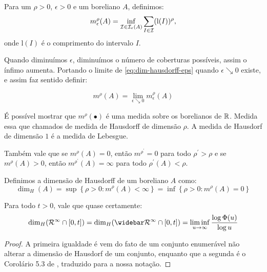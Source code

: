 Para um $\rho > 0$, $\epsilon > 0$ e um boreliano $A$, definimos:
\begin{equation}
  \label{eq:dim-hausdorff-eps}
  m^\rho_\epsilon(A) = \inf_{{\mathcal{I}} \in {\mathcal{I}}_\epsilon(A)} 
  \sum_{I \in {\mathcal{I}}} (\mathrm{l}(I))^\rho, 
\end{equation}
onde  $\mathrm{l}(I)$ é o comprimento do intervalo $I$.

Quando diminuímos $\epsilon$, diminuímos o número de coberturas
possíveis, assim o ínfimo aumenta. Portando o limite de
\eqref{eq:dim-hausdorff-eps} quando $\epsilon \searrow 0$ existe, e
assim faz sentido definir:

\begin{equation}
  \label{eq:dim-hausdorf}
  m^\rho(A) = \lim_{\epsilon \searrow 0} m^\rho_\epsilon (A)
\end{equation}

É possível mostrar que $m^\rho(\bullet)$ é uma medida sobre os
borelianos de ${\mathbb{R}}$. Medida essa que chamados de medida de Hausdorff de
dimensão $\rho$.  A medida de Hausdorf de dimensão $1$ é a medida de
Lebesgue.

Também vale que se $m^\rho(A) = 0$, então $m^{\rho^\prime} = 0$ para
todo $\rho^\prime > \rho$ e se $m^\rho(A) > 0$, então $m^{\rho^\prime}(A)
= \infty$ para todo $\rho^\prime(A) < \rho$.

\begin{definicao}
  Definimos a dimensão de Hausdorff de um boreliano $A$ como:
  \begin{displaymath}
    \dim_H(A) = \sup \left\{ \rho > 0 : m^\rho(A) < \infty \right\}
    = \inf \left\{ \rho > 0: m^\rho(A) = 0 \right\}
  \end{displaymath}
\end{definicao}

\begin{teorema}
  Para todo $t > 0$, vale que quase certamente:
  \begin{displaymath}
    \dim_H(\RR^\infty \cap [0, t]) = 
    \dim_H(\RRb^\infty \cap [0, t]) =
    \liminf_{u \to \infty} \frac{\log \Phi(u)}{\log u}
  \end{displaymath}
\end{teorema}
\begin{proof}
  A primeira igualdade é vem do fato de um conjunto enumerável não
  alterar a dimensão de Hausdorf de um conjunto, enquanto que a
  segunda é o Corolário 5.3 de \cite{bertoin:97}, traduzido para a
  nossa notação.
\end{proof}

